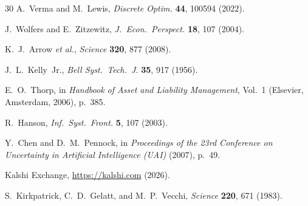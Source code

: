 \documentclass[aps, reprint, prl, twocolumn, superscriptaddress,amsmath,amssymb,noeprint]{revtex4-2}
\begin{document}
\begin{thebibliography}{30}
A.~Verma and M.~Lewis, \emph{Discrete Optim.} \textbf{44}, 100594 (2022).

J.~Wolfers and E.~Zitzewitz, \emph{J.\ Econ.\ Perspect.} \textbf{18}, 107
(2004).

K.~J.~Arrow \emph{et al.}, \emph{Science} \textbf{320}, 877 (2008).

J.~L.~Kelly~Jr., \emph{Bell Syst.\ Tech.\ J.} \textbf{35}, 917 (1956).

E.~O.~Thorp, in \emph{Handbook of Asset and Liability Management},
Vol.~1 (Elsevier, Amsterdam, 2006), p.~385.

R.~Hanson, \emph{Inf.\ Syst.\ Front.} \textbf{5}, 107 (2003).

Y.~Chen and D.~M.~Pennock, in \emph{Proceedings of the 23rd Conference on
Uncertainty in Artificial Intelligence (UAI)} (2007), p.~49.

Kalshi Exchange, \url{https://kalshi.com} (2026).


S.~Kirkpatrick, C.~D.~Gelatt, and M.~P.~Vecchi, \emph{Science} \textbf{220},
671 (1983).

\end{thebibliography}
\end{document}

